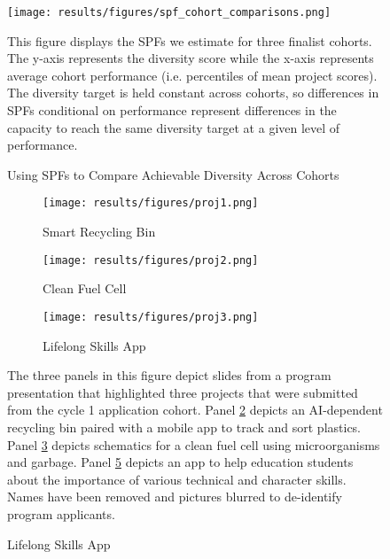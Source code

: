     \newpage
    \begin{figure}[!htb]
    \centering
        \caption{Using SPFs to Compare Achievable Diversity Across Cohorts}\label{fig:diversity_across_cohorts}
      \texttt{[image: results/figures/spf\_cohort\_comparisons.png]} 
        \begin{notes}
        This figure displays the SPFs we estimate for three finalist cohorts. The y-axis represents the diversity score while the x-axis represents average cohort performance (i.e. percentiles of mean project scores). The diversity target is held constant across cohorts, so differences in SPFs conditional on performance represent differences in the capacity to reach the same diversity target at a given level of performance. 
        \end{notes}
    \end{figure}
    
    \newpage
    \begin{figure}[!htb]
        \centering
        \caption{Example Projects from Cycle 1}\label{fig:example_projects}
        \begin{subfigure}[]{.45\textwidth}
            \centering
                    \caption{Smart Recycling Bin} \label{subfig:can}
            \texttt{[image: results/figures/proj1.png]} 
        \end{subfigure}
        \hfill
        \vspace{1em}
        \begin{subfigure}[]{.45\textwidth}
            \centering
                    \caption{Clean Fuel Cell} \label{subfig:cell}
            \texttt{[image: results/figures/proj2.png]} 
        \end{subfigure}
        \hfill
        \vspace{1em}
        \begin{subfigure}[]{.45\textwidth}
            \centering
                   \caption{Lifelong Skills App} \label{subfig:app}
            \texttt{[image: results/figures/proj3.png]} 
        \end{subfigure}
        \begin{notes}
        The three panels in this figure depict slides from a program presentation that highlighted three projects that were submitted from the cycle 1 application cohort. Panel \ref{subfig:can} depicts an AI-dependent recycling bin paired with a mobile app to track and sort plastics. Panel \ref{subfig:cell} depicts schematics for a clean fuel cell using microorganisms and garbage. Panel \ref{subfig:app} depicts an app to help education students about the importance of various technical and character skills. Names have been removed and pictures blurred to de-identify program applicants.
        \end{notes}
    \end{figure}
    
